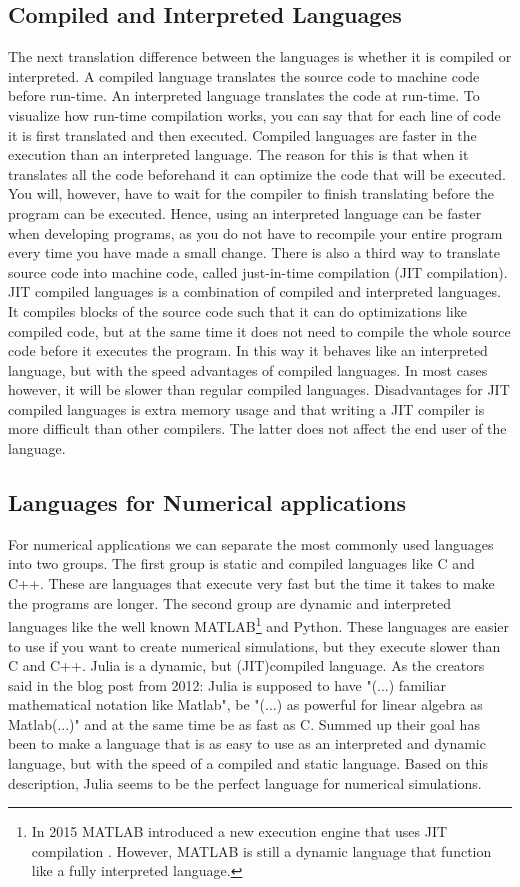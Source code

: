 \subsection{Compiled and Interpreted Languages}
The next translation difference between the languages is whether it is compiled or interpreted. A compiled language translates the source code to machine code before run-time. An interpreted language translates the code at run-time. To visualize how run-time compilation works, you can say that for each line of code it is first translated and then executed. Compiled languages are faster in the execution than an interpreted language. The reason for this is that when it translates all the code beforehand it can optimize the code that will be executed. You will, however, have to wait for the compiler to finish translating before the program can be executed. Hence, using an interpreted language can be faster when developing programs, as you do not have to recompile your entire program every time you have made a small change. There is also a third way to translate source code into machine code, called just-in-time compilation (JIT compilation). JIT compiled languages is a combination of compiled and interpreted languages. It compiles blocks of the source code such that it can do optimizations like compiled code, but at the same time it does not need to compile the whole source code before it executes the program. In this way it behaves like an interpreted language, but with the speed advantages of compiled languages. In most cases however, it will be slower than regular compiled languages. Disadvantages for JIT compiled languages is extra memory usage and that writing a JIT compiler is more difficult than other compilers. The latter does not affect the end user of the language.

\subsection{Languages for Numerical applications}
For numerical applications we can separate the most commonly used languages into two groups. The first group is static and compiled languages like C and C++. These are languages that execute very fast but the time it takes to make the programs are longer. The second group are dynamic and interpreted languages like the well known MATLAB\footnote{In 2015 MATLAB introduced a new execution engine that uses JIT compilation \emph{\citep{MatlabJIT}}. However, MATLAB is still a dynamic language that function like a fully interpreted language.} and Python. These languages are easier to use if you want to create numerical simulations, but they execute slower than C and C++. Julia is a dynamic, but (JIT)compiled language. As the creators said in the blog post from 2012: Julia is supposed to have "(...) familiar mathematical notation like Matlab", be "(...) as  powerful  for  linear  algebra  as Matlab(...)" and at the same time be as fast as C. Summed up their goal has been to make a language that is as easy to use as an interpreted and dynamic language, but with the speed of a compiled and static language. Based on this description, Julia seems to be the perfect language for numerical simulations.

